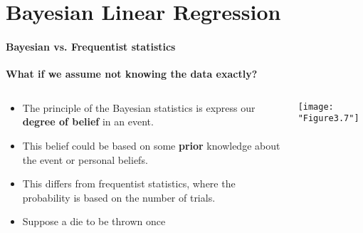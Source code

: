 \section{Bayesian Linear Regression}
\framecard{\insertsection}

\begin{frame}{\insertsection}
	\framesubtitle{Bayesian vs. Frequentist statistics}
	
	\textcolor{UniGold}{\textbf{What if we assume not knowing the data exactly?}}

	\begin{columns}
		\begin{column}{0.475\textwidth}
			\begin{itemize}
				\item The principle of the Bayesian statistics is express our \textcolor{UniOrange}{\textbf{degree of belief}} in an event.
				\item This belief could be based on some \textcolor{UniOrange}{\textbf{prior}} knowledge about the event or personal beliefs.
				\item This differs from frequentist statistics, where the probability is based on the number of trials.
				\item Suppose a die to be thrown once
			\end{itemize}
			\end{column}
			\begin{column}{0.475\textwidth}   
				\centering
				\texttt{[image: "Figure3.7"]}
			\end{column}
		\end{columns}
\end{frame}
	
